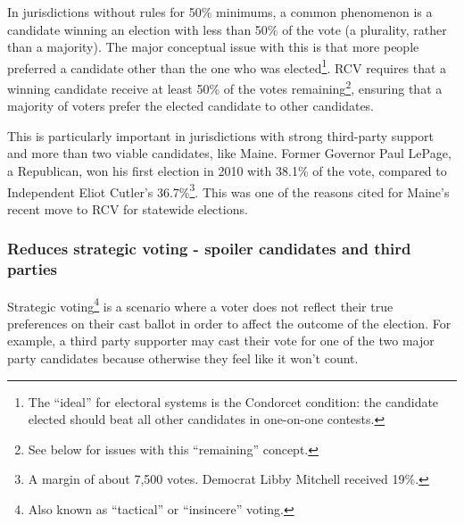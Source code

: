 \documentclass[12pt,twoside]{reedthesis}
\begin{document}
In jurisdictions without rules for 50\% minimums, a common phenomenon is a candidate winning an election with less than 50\% of the vote (a plurality, rather than a majority). The major conceptual issue with this is that more people preferred a candidate other than the one who was elected\footnote{The ``ideal'' for electoral systems is the Condorcet condition: the candidate elected should beat all other candidates in one-on-one contests.}. RCV requires that a winning candidate receive at least 50\% of the votes remaining\footnote{See below for issues with this ``remaining'' concept.}, ensuring that a majority of voters prefer the elected candidate to other candidates.

This is particularly important in jurisdictions with strong third-party support and more than two viable candidates, like Maine. Former Governor Paul LePage, a Republican, won his first election in 2010 with 38.1\% of the vote, compared to Independent Eliot Cutler's 36.7\%\footnote{A margin of about 7,500 votes. Democrat Libby Mitchell received 19\%.}. This was one of the reasons cited for Maine's recent move to RCV for statewide elections.

\hypertarget{reduces-strategic-voting---spoiler-candidates-and-third-parties}{%
\subsubsection{Reduces strategic voting - spoiler candidates and third parties}\label{reduces-strategic-voting---spoiler-candidates-and-third-parties}}

Strategic voting\footnote{Also known as ``tactical'' or ``insincere'' voting.} is a scenario where a voter does not reflect their true preferences on their cast ballot in order to affect the outcome of the election. For example, a third party supporter may cast their vote for one of the two major party candidates because otherwise they feel like it won't count.
\end{document}

